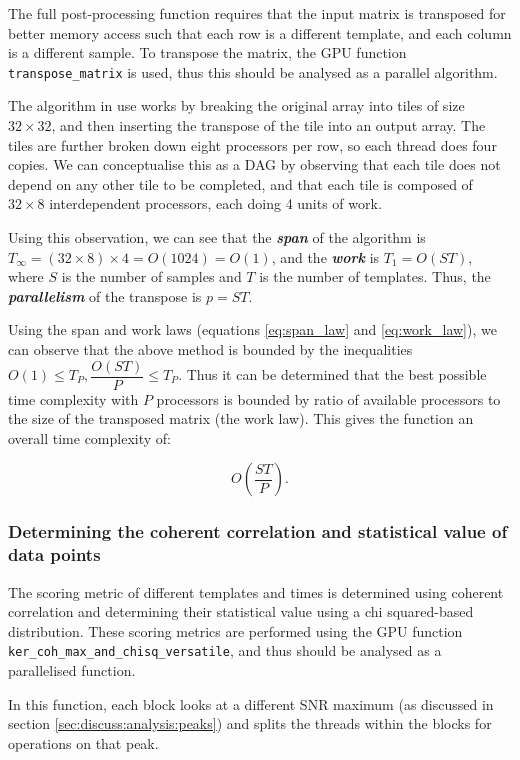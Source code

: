 \documentclass{article}
\begin{document}
The full post-processing function requires that the input matrix is transposed for better memory access such that each row is a different template, and each column is a different sample.
To transpose the matrix, the GPU function \texttt{transpose\_matrix} is used, thus this should be analysed as a parallel algorithm.

The algorithm in use works by breaking the original array into tiles of size \(32\times32\), and then inserting the transpose of the tile into an output array.
The tiles are further broken down eight processors per row, so each thread does four copies.
We can conceptualise this as a DAG by observing that each tile does not depend on any other tile to be completed, and that each tile is composed of \(32\times8\) interdependent processors, each doing 4 units of work.

Using this observation, we can see that the \textit{\textbf{span}} of the algorithm is \(T_\infty = (32\times8)\times4 = O(1024) = O(1)\), and the \textit{\textbf{work}} is \(T_1 = O(ST)\), where \(S\) is the number of samples and \(T\) is the number of templates.
Thus, the \textit{\textbf{parallelism}} of the transpose is \(p = ST\).

Using the span and work laws (equations \ref{eq:span_law} and \ref{eq:work_law}), we can observe that the above method is bounded by the inequalities \(O(1) \leq T_P, \dfrac{O(ST)}{P} \leq T_P\).
Thus it can be determined that the best possible time complexity with \(P\) processors is bounded by ratio of available processors to the size of the transposed matrix (the work law).
This gives the function an overall time complexity of:

\[
    O(\dfrac{ST}{P}).
\]

\subsubsection{Determining the coherent correlation and statistical value of data points} \label{sec:discuss:analysis:coh_max_and_chisq_versatile}

The scoring metric of different templates and times is determined using coherent correlation and determining their statistical value using a chi squared-based distribution.
These scoring metrics are performed using the GPU function \texttt{ker\_coh\_max\_and\_chisq\_versatile}, and thus should be analysed as a parallelised function.

In this function, each block looks at a different SNR maximum (as discussed in section \ref{sec:discuss:analysis:peaks}) and splits the threads within the blocks for operations on that peak.
\end{document}
